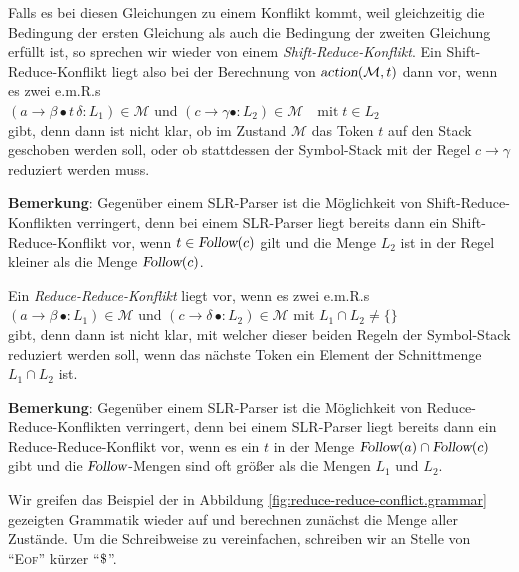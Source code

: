 Falls es bei diesen Gleichungen zu einem Konflikt kommt, weil gleichzeitig die Bedingung
der ersten Gleichung als auch die Bedingung der zweiten Gleichung erf\"ullt ist, so sprechen
wir wieder von einem \emph{Shift-Reduce-Konflikt}.  
Ein Shift-Reduce-Konflikt liegt also bei der Berechnung von
$\textsl{action}(\mathcal{M},t)$ dann vor, wenn es zwei e.m.R.s 
\\[0.2cm]
\hspace*{1.3cm}
$(a \rightarrow \beta \bullet t\, \delta:L_1) \in \mathcal{M}$ \quad \mbox{und} \quad 
$(c \rightarrow \gamma\bullet :L_2) \in \mathcal{M} \quad \mbox{mit}\; t \in L_2$
\\[0.2cm]
gibt, denn dann ist nicht klar, ob im Zustand $\mathcal{M}$ das Token $t$ auf den Stack geschoben werden
soll, oder ob stattdessen der Symbol-Stack mit der Regel $c \rightarrow \gamma$ reduziert werden muss.
\vspace*{0.2cm}

\noindent
\textbf{Bemerkung}:  Gegen\"uber einem SLR-Parser ist die M\"oglichkeit von
Shift-Reduce-Konflikten verringert, denn  bei einem SLR-Parser liegt bereits dann ein
Shift-Reduce-Konflikt vor, wenn $t \in \textsl{Follow}(c)$ gilt und die Menge $L_2$ ist in der Regel kleiner als die
Menge $\textsl{Follow}(c)$.  \eox 
\vspace*{0.3cm}

Ein \emph{Reduce-Reduce-Konflikt} liegt vor, wenn es zwei e.m.R.s 
\\[0.2cm]
\hspace*{1.3cm}
$(a \rightarrow \beta\, \bullet:L_1) \in \mathcal{M}$ \quad \mbox{und} \quad 
$(c \rightarrow \delta\, \bullet:L_2) \in \mathcal{M}$ \quad \mbox{mit} \quad $L_1 \cap L_2 \not= \{\}$
\\[0.2cm]
gibt, denn dann ist nicht klar, mit welcher dieser beiden Regeln der Symbol-Stack reduziert werden soll,
wenn das n\"achste Token ein Element der Schnittmenge $L_1 \cap L_2$ ist.
\vspace*{0.2cm}

\noindent
\textbf{Bemerkung}:  Gegen\"uber einem SLR-Parser ist die M\"oglichkeit von
Reduce-Reduce-Konflikten verringert, denn  bei einem SLR-Parser liegt bereits dann ein
Reduce-Reduce-Konflikt vor, wenn es ein $t$ in der Menge
 $\textsl{Follow}(a) \cap \textsl{Follow}(c)$ gibt und die $\textsl{Follow}$-Mengen sind oft gr\"o{\ss}er als die Mengen
$L_1$ und $L_2$.  \eox
\vspace*{0.3cm}


\example
Wir greifen das Beispiel der in Abbildung \ref{fig:reduce-reduce-conflict.grammar} gezeigten Grammatik
wieder auf und berechnen zun\"achst die Menge aller Zust\"ande.  Um die Schreibweise zu
vereinfachen, schreiben wir an Stelle von ``\textsc{Eof}'' k\"urzer ``$\symbol{36}$''.

